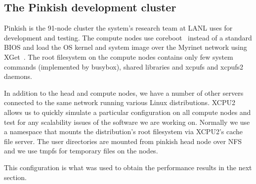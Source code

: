 \subsection{The Pinkish development cluster}

Pinkish is the 91-node cluster the system's research team at LANL uses for
development and testing. The compute nodes use coreboot~\cite{coreboot}
instead of a standard BIOS and load the OS kernel and system image over the
Myrinet network using XGet~\cite{xget}. The root filesystem on the compute
nodes contains only few system commands (implemented by busybox), shared
libraries and xcpufs and xcpufs2 daemons.

In addition to the head and compute nodes, we have a number of other
servers connected to the same network running various Linux distributions.
XCPU2 allows us to quickly simulate a particular configuration on all
compute nodes and test for any scalability issues of the software we are
working on. Normally we use a namespace that mounts the distribution's root
filesystem via XCPU2's cache file server. The user directories are mounted
from pinkish head node over NFS and we use tmpfs for temporary files on the
nodes.

This configuration is what was used to obtain the performance results
in the next section.
